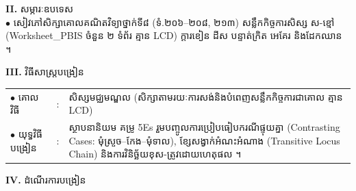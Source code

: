 \documentclass[a4paper,10pt]{article}
\newcommand{\en}[1]{{\TimesEn #1}}
\begin{document}
{\vspace{2pt}

\textbf{II.} {\muol សម្ភារៈឧបទេស}\\[1pt]
\hspace*{0.55cm}$\bullet$ \hspace{0.35cm} សៀវភៅសិក្សាគោលគណិតវិទ្យាថ្នាក់ទី៨ (ទំ.២០៦--២០៨, ២១៣) សន្លឹកកិច្ចការសិស្ស ស-ខ្មៅ (\en{Worksheet\_PBIS} ចំនួន ២ ទំព័រ គ្មាន \en{LCD}) ក្ដារខៀន ដីស បន្ទាត់ក្រិត អេគែរ និងដែកឈាន ។

\vspace{2pt}

\textbf{III.} {\muol វិធីសាស្រ្តបង្រៀន}\\[1pt]
\hspace*{0.45cm}%
\begin{tabular}{@{}l l L{14.85cm}@{}}
  $\bullet$ \hspace{0.25cm} គោលវិធី & : & សិស្សមជ្ឈមណ្ឌល (សិក្សាតាមរយៈការសង់និងបំពេញសន្លឹកកិច្ចការជាគោល គ្មាន \en{LCD}) \\
  $\bullet$ \hspace{0.25cm} យុទ្ធវិធីបង្រៀន & : & ស្ថាបនានិយម គម្រូ \en{5Es} រួមបញ្ចូលការប្រៀបធៀបករណីផ្ទុយគ្នា (\en{Contrasting Cases:} មុំស្រួច--កែង--មុំទាល), ខ្សែសង្វាក់អំណះអំណាង (\en{Transitive Locus Chain}) និងការវិនិច្ឆ័យខុស-ត្រូវដោយហេតុផល ។ \\
\end{tabular}
}

\vspace{2pt}

\textbf{IV.} {\muol ដំណើរការបង្រៀន}

\vspace{1pt}
\end{document}
